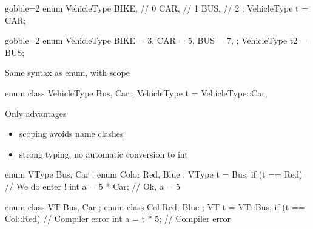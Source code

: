 \begin{frame}[fragile]
  \begin{multicols}{2}
    \begin{cppcode*}{gobble=2}
      enum VehicleType {
        BIKE,  // 0
        CAR,   // 1
        BUS,   // 2
      };
      VehicleType t = CAR;
    \end{cppcode*}
    \columnbreak
    \begin{cppcode*}{gobble=2}
      enum VehicleType {
        BIKE = 3,
        CAR = 5,
        BUS = 7,
      };
      VehicleType t2 = BUS;
    \end{cppcode*}
  \end{multicols}
\end{frame}

\begin{frame}[fragile]
  \begin{block}{Same syntax as enum, with scope}
    \begin{cppcode*}{}
      enum class VehicleType { Bus, Car };
      VehicleType t = VehicleType::Car;
    \end{cppcode*}
  \end{block}
  \pause
  \begin{exampleblock}{Only advantages}
    \begin{itemize}
    \item scoping avoids name clashes
    \item strong typing, no automatic conversion to int
    \end{itemize}
    \small
    \begin{cppcode*}{}
      enum VType { Bus, Car }; enum Color { Red, Blue };
      VType t = Bus;
      if (t == Red) {  // We do enter !  }
      int a = 5 * Car; // Ok, a = 5
      
      enum class VT { Bus, Car }; enum class Col { Red, Blue };
      VT t = VT::Bus;
      if (t == Col::Red) { // Compiler error }
      int a = t * 5;       // Compiler error
    \end{cppcode*}
  \end{exampleblock}
\end{frame}

